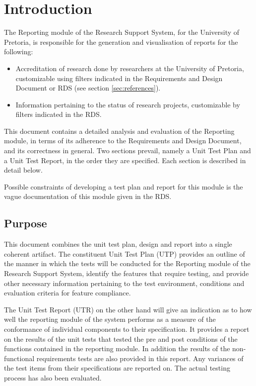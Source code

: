 \section{Introduction}
The Reporting module of the Research Support System, for the University of Pretoria, is responsible for the generation and visualisation of reports for the following:
\begin{itemize}
	\item Accreditation of research done by researchers at the University of Pretoria, customizable using filters indicated in the Requirements and Design Document or RDS (see section \ref{sec:references}).
	\item Information pertaining to the status of research projects, customizable by filters indicated in the RDS.
\end{itemize}
This document contains a detailed analysis and evaluation of the Reporting module, in terms of its adherence to the Requirements and Design Document, and its correctness in general. Two sections prevail, namely a Unit Test Plan and a Unit Test Report, in the order they are specified. Each section is described in detail below. \par Possible constraints of developing a test plan and report for this module is the vague documentation of this module given in the RDS.

\subsection{Purpose}
This document combines the unit test plan, design and report into a single coherent artifact. The constituent Unit Test Plan (UTP) provides an outline of the manner in which the tests will be conducted for the Reporting module of the Research Support System, identify the features that require testing, and provide other necessary information pertaining to the test environment, conditions and evaluation criteria for feature compliance.
\par The Unit Test Report (UTR) on the other hand will give an indication as to how well the reporting module of the system performs as a measure of the conformance of individual components to their specification. It provides a report on the results of the unit tests that tested the pre and post conditions of the functions contained in the reporting module. In addition the results of the non-functional requirements tests are also provided in this report. Any variances of the test items from their specifications are reported on. The actual testing process has also been evaluated.

